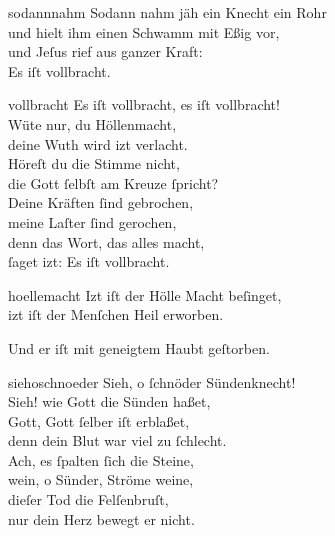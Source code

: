 \documentclass[shorttitlesize=55,tocstyle=ref-genre]{ees}
\begin{document}
{\begin{movement}{sodannnahm}
  \voice[Evangelium]
  Sodann nahm jäh ein Knecht ein Rohr\\
  und hielt ihm einen Schwamm mit Eßig vor,\\
  und Jeſus rief aus ganzer Kraft:\\
  Es iſt vollbracht.
\end{movement}

\begin{movement}{vollbracht}
  Es iſt vollbracht, es iſt vollbracht!\\
  Wüte nur, du Höllenmacht,\\
  deine Wuth wird izt verlacht.\\
  Höreſt du die Stimme nicht,\\
  die Gott ſelbſt am Kreuze ſpricht?\\
  Deine Kräften ſind gebrochen,\\
  meine Laſter ſind gerochen,\\
  denn das Wort, das alles macht,\\
  ſaget izt: Es iſt vollbracht.
\end{movement}

\begin{movement}{hoellemacht}
  Izt iſt der Hölle Macht beſinget,\\
  izt iſt der Menſchen Heil erworben.

  \voice[Evangelium]
  Und er iſt mit geneigtem Haubt geſtorben.
\end{movement}

\begin{movement}{siehoschnoeder}
  Sieh, o ſchnöder Sündenknecht!\\
  Sieh! wie Gott die Sünden haßet,\\
  Gott, Gott ſelber iſt erblaßet,\\
  denn dein Blut war viel zu ſchlecht.\\
  Ach, es ſpalten ſich die Steine,\\
  wein, o Sünder, Ströme weine,\\
  dieſer Tod die Felſenbruſt,\\
  nur dein Herz bewegt er nicht.
\end{movement}

}
\end{document}
